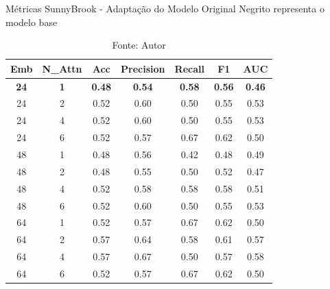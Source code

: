 \begin{table}[htbp]
\centering
\caption{Métricas SunnyBrook - Adaptação do Modelo Original
\newline Negrito representa o modelo base}
\begin{tabular}{ccccccc}
\toprule
\textbf{Emb} & \textbf{N\_Attn} & \textbf{Acc} & \textbf{Precision} & \textbf{Recall} & \textbf{F1} & \textbf{AUC} \\
\midrule
\textbf{24} & \textbf{1} & \textbf{0.48} & \textbf{0.54} & \textbf{0.58} & \textbf{0.56} & \textbf{0.46} \\
24 & 2 & 0.52 & 0.60 & 0.50 & 0.55 & 0.53 \\
24 & 4 & 0.52 & 0.60 & 0.50 & 0.55 & 0.53 \\
24 & 6 & 0.52 & 0.57 & 0.67 & 0.62 & 0.50 \\
48 & 1 & 0.48 & 0.56 & 0.42 & 0.48 & 0.49 \\
48 & 2 & 0.48 & 0.55 & 0.50 & 0.52 & 0.47 \\
48 & 4 & 0.52 & 0.58 & 0.58 & 0.58 & 0.51 \\
48 & 6 & 0.52 & 0.60 & 0.50 & 0.55 & 0.53 \\
64 & 1 & 0.52 & 0.57 & 0.67 & 0.62 & 0.50 \\
64 & 2 & 0.57 & 0.64 & 0.58 & 0.61 & 0.57 \\
64 & 4 & 0.57 & 0.67 & 0.50 & 0.57 & 0.58 \\
64 & 6 & 0.52 & 0.57 & 0.67 & 0.62 & 0.50 \\
\bottomrule
\end{tabular}
\caption*{Fonte: Autor}
\label{tab:metrics_sunny_orig}
\end{table}



